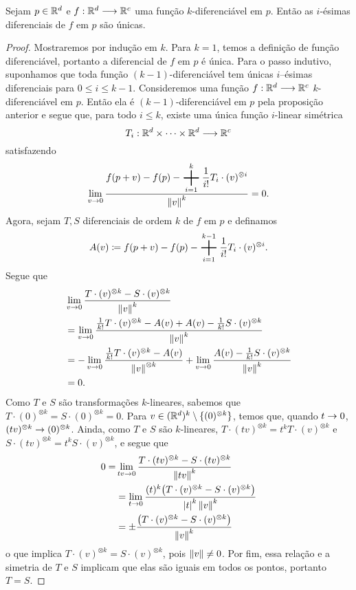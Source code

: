 \begin{prop}
Sejam $p \in \mathbb{R}^d$ e $f: \mathbb{R}^d \longrightarrow \mathbb{R}^c$ uma função $k$-diferenciável em $p$. Então as $i$-ésimas diferenciais de $f$ em $p$ são únicas.
\end{prop}
\begin{proof}
Mostraremos por indução em $k$. Para $k=1$, temos a definição de função diferenciável, portanto a diferencial de $f$ em $p$ é única. Para o passo indutivo, suponhamos que toda função $(k-1)$-diferenciável tem únicas $i$--ésimas diferenciais para $0\leq i \leq k-1$. Consideremos uma função $f: \mathbb{R}^d \longrightarrow \mathbb{R}^c$ $k$-diferenciável em $p$. Então ela é $(k-1)$-diferenciável em $p$ pela proposição anterior e segue que, para todo $i \leq k$, existe uma única função $i$-linear simétrica
	\begin{equation*}
	T_i: \mathbb{R}^d \times \cdots \times \mathbb{R}^d \longrightarrow \mathbb{R}^c
	\end{equation*}
satisfazendo
	\begin{equation*}
	\lim_{v \conv 0} \frac{\displaystyle f(p+v)-f(p)- \bigplus_{i=1}^k \frac{1}{i!}T_i \cdot (v)^{\otimes i}}{\nor{v}^k} = 0.
	\end{equation*}
Agora, sejam $T,S$ diferenciais de ordem $k$ de $f$ em $p$ e definamos
	\begin{equation*}
	A(v) \coloneqq f(p+v)-f(p)- \bigplus_{i=1}^{k-1} \frac{1}{i!}T_i \cdot (v)^{\otimes i}.
	\end{equation*}
Segue que
	\begin{align*}
	&\lim_{v \rightarrow 0} \frac{T \cdot (v)^{\otimes k} - S \cdot (v)^{\otimes k}}{\left\Vert{v}\right\Vert^k} \\
	&= \lim_{v \rightarrow 0} \frac{\frac{1}{k!} T \cdot (v)^{\otimes k} - A(v) + A(v) - \frac{1}{k!} S \cdot (v)^{\otimes k}}{\left\Vert{v}\right\Vert^k} \\
	&= -\lim_{v \rightarrow 0} \frac{\frac{1}{k!} T \cdot (v)^{\otimes k} - A(v)}{\left\Vert{v}\right\Vert^{\otimes k}} + \lim_{v \rightarrow 0} \frac{A(v) - \frac{1}{k!} S \cdot (v)^{\otimes k}}{\left\Vert{v}\right\Vert^k} \\
	&= 0.
	\end{align*}
Como $T$ e $S$ são transformações $k$-lineares, sabemos que $T \cdot (0)^{\otimes k} = S \cdot (0)^{\otimes k} =0$. Para $v \in (\mathbb{R}^d)^k \setminus\{(0)^{\otimes k}\}$, temos que, quando $t \rightarrow 0$, $(tv)^{\otimes k} \rightarrow (0)^{\otimes k}$. Ainda, como $T$ e $S$ são $k$-lineares, $T \cdot (tv)^{\otimes k} = t^kT \cdot (v)^{\otimes k}$ e $S \cdot (tv)^{\otimes k} = t^kS \cdot (v)^{\otimes k}$, e segue que
	\begin{align*}
	0= &\lim_{tv \rightarrow 0} \frac{T \cdot (tv)^{\otimes k} -  S \cdot (tv)^{\otimes k}}{\left\Vert{tv}\right\Vert^k} \\
	&= \lim_{t \rightarrow 0} \frac{(t)^k\big(T \cdot (v)^{\otimes k} -  S \cdot (v)^{\otimes k}\big)}{\left\vert{t}\right\vert^k\left\Vert{v}\right\Vert^k} \\
	&= \pm \frac{\big(T \cdot (v)^{\otimes k} -  S \cdot (v)^{\otimes k}\big)}{\left\Vert{v}\right\Vert^k}
	\end{align*}
o que implica $T \cdot (v)^{\otimes k} =  S \cdot (v)^{\otimes k}$, pois $\left\Vert{v}\right\Vert \neq 0$. Por fim, essa relação e a simetria de $T$ e $S$ implicam que elas são iguais em todos os pontos, portanto $T=S$.
\end{proof}

